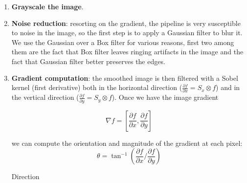 \documentclass{article}
\begin{document}
\begin{enumerate}[start=0]
    \item \textbf{Grayscale the image}.
    \item \textbf{Noise reduction}: resorting on the gradient, the pipeline is very susceptible to noise in the image, so the first step is to apply a Gaussian filter to blur it. We use the Gaussian over a Box filter for various reasons, first two among them are the fact that Box filter leaves ringing artifacts in the image and the fact that Gaussian filter better preserves the edges.
    \item \textbf{Gradient computation}: the smoothed image is then filtered with a Sobel kernel (first derivative) both in the horizontal direction ($\frac{\partial f}{\partial x} = S_x \otimes f$) and in the vertical direction ($\frac{\partial f}{\partial y} = S_y \otimes f$). 
    Once we have the image gradient 
    \begin{center}
        \begin{equation*}
            \nabla f = \left[ \frac{\partial f}{\partial x}, \frac{\partial f}{\partial y} \right]
        \end{equation*}
    \end{center}
    we can compute the orientation and magnitude of the gradient at each pixel:
        \begin{equation*}
        \theta = \tan^{-1}{\left( \frac{\partial f}{\partial x} / \frac{\partial f}{\partial y} \right)}
    \end{equation*}
    \begin{center}
        Direction
    \end{center}


\end{enumerate}
\end{document}
